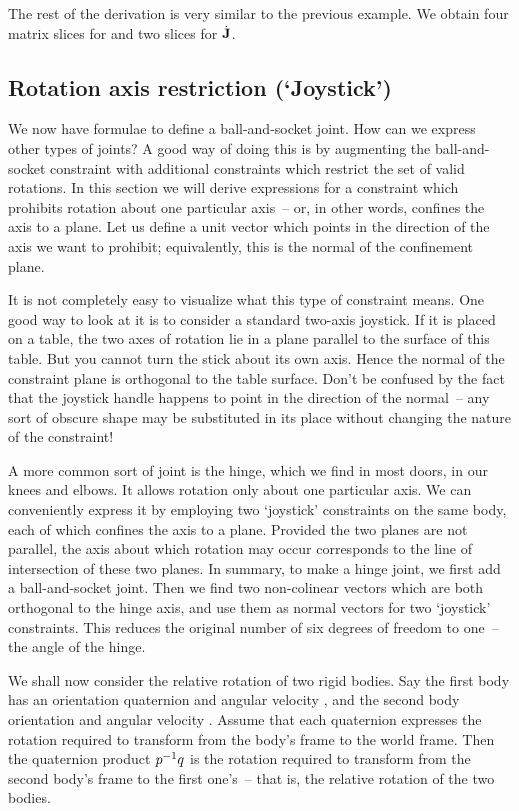 The rest of the derivation is very similar to the previous example. We obtain four
matrix slices for  and two slices for $\dot{\m{J}}$.


\subsection{Rotation axis restriction (`Joystick')\label{constrJoystick}}

We now have formulae to define a ball-and-socket joint. How can we express other types
of joints? A good way of doing this is by augmenting the ball-and-socket constraint with
additional constraints which restrict the set of valid rotations. In this section we will
derive expressions for a constraint which prohibits rotation about one particular axis~--
or, in other words, confines the axis to a plane. Let us define a unit vector  which
points in the direction of the axis we want to prohibit; equivalently, this is the normal of
the confinement plane.

It is not completely easy to visualize what this type of constraint means. One good way to look
at it is to consider a standard two-axis joystick. If it is placed on a table, the two axes of
rotation lie in a plane parallel to the surface of this table. But you cannot turn the stick about
its own axis. Hence the normal of the constraint plane is orthogonal to the table surface.
Don't be confused by the fact that the joystick handle happens to point in the direction of the
normal~-- any sort of obscure shape may be substituted in its place without changing the nature
of the constraint!

A more common sort of joint is the hinge, which we find in most doors, in our knees and elbows.
It allows rotation only about one particular axis. We can conveniently express it by employing two
`joystick' constraints on the same body, each of which confines the axis to a plane. Provided the
two planes are not parallel, the axis about which rotation may occur corresponds to the line of
intersection of these two planes. In summary, to make a hinge joint, we first add a
ball-and-socket joint. Then we find two non-colinear vectors which are both orthogonal to the
hinge axis, and use them as normal vectors for two `joystick' constraints. This reduces the
original number of six degrees of freedom to one~-- the angle of the hinge.

We shall now consider the relative rotation of two rigid bodies. Say the first body has an
orientation quaternion  and angular velocity \ve{\phi}, and the second body orientation
 and angular velocity \ve{\omega}. Assume that each quaternion expresses the rotation
required to transform from the body's frame to the world frame. Then the quaternion product
$\mbox{$p$}^{-1}\mbox{$q$}$ is the rotation required to transform from the second body's frame to the first
one's~-- that is, the relative rotation of the two bodies.

